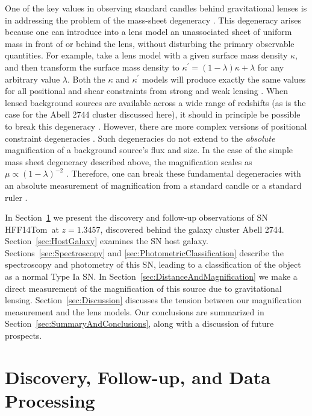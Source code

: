 \documentclass[iop]{emulateapj}
\def\tomas{HFF14Tom}
\begin{document}
One of the key values in observing standard candles behind
gravitational lenses is in addressing the problem of the mass-sheet
degeneracy \citep{Falco:1985,Schneider:1995}.  This degeneracy arises
because one can introduce into a lens model an unassociated sheet of
uniform mass in front of or behind the lens, without disturbing the
primary observable quantities.  For example, take a lens model with a
given surface mass density $\kappa$, and then transform the surface
mass density to $\kappa^{\prime}=(1-\lambda)\kappa+\lambda$ for any
arbitrary value $\lambda$.  Both the $\kappa$ and $\kappa^{\prime}$
models will produce exactly the same values for all positional and
shear constraints from strong and weak lensing \citep{Seitz:1997}.
When lensed background sources are available across a wide range of
redshifts (as is the case for the Abell 2744 cluster discussed here),
it should in principle be possible to break this
degeneracy \citep{Seitz:1997,Bradac:2004}.  However, there are more
complex versions of positional constraint
degeneracies \citep{Liesenborgs:2012,Schneider:2014}.  Such
degeneracies do not extend to the {\it absolute} magnification of a
background source's flux and size. In the case of the simple
mass sheet degeneracy described above, the magnification scales as
$\mu\propto(1-\lambda)^{-2}$ \citep[see e.g.][]{Bartelmann:2010}.
Therefore, one can break these fundamental degeneracies with an
absolute measurement of magnification from a standard
candle \citep{Holz:2001} or a standard ruler \citep{Sonnenfeld:2011}.

In Section~\ref{sec:DiscoveryAndFollowup} we present the discovery and
follow-up observations of SN \tomas\ at $z=1.3457$, discovered behind
the galaxy cluster Abell 2744.  Section~\ref{sec:HostGalaxy} examines
the SN host galaxy.  Sections~\ref{sec:Spectroscopy}
and \ref{sec:PhotometricClassification} describe the spectroscopy and
photometry of this SN, leading to a classification of the object as a
normal Type Ia SN.  In Section~\ref{sec:DistanceAndMagnification} we
make a direct measurement of the magnification of this source due to
gravitational lensing.  Section~\ref{sec:Discussion} discusses the
tension between our magnification measurement and the lens models. Our
conclusions are summarized in Section~\ref{sec:SummaryAndConclusions},
along with a discussion of future prospects. 

\section{Discovery, Follow-up, and Data Processing}
\label{sec:DiscoveryAndFollowup}
\end{document}

